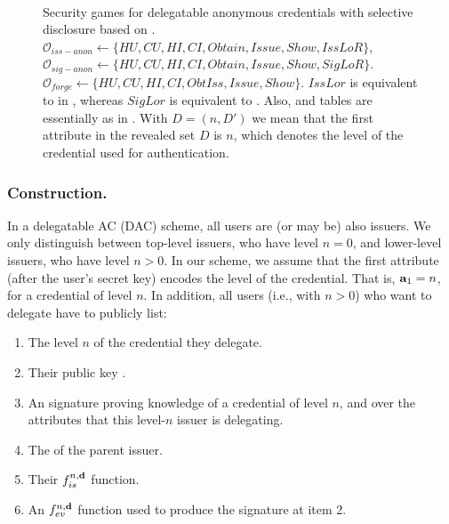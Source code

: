 \begin{figure}[ht!]
{\begin{minipage}[t]{.6\textwidth}
{        \pcind {} \\
      }       
    \end{minipage}      
  }
  \caption{Security games for delegatable anonymous credentials with selective
    disclosure based on \cite{fhs19}. $\mathcal{O}_{iss-anon} \gets \lbrace HU,
    CU,HI,CI,Obtain,Issue,Show,IssLoR\rbrace$, $\mathcal{O}_{sig-anon} \gets
    \lbrace HU,CU,HI,CI,Obtain,Issue,Show,SigLoR\rbrace$. $\mathcal{O}_{forge}
    \gets \lbrace HU,CU,HI,CI,ObtIss,Issue,Show \rbrace$. $IssLor$ is equivalent
    to \OBTCHALb in \UAS, whereas $SigLor$ is equivalent to \CHALb. Also, \OWNR
    and \ATTR tables are essentially as in . With $D =
    (n,D')$ we mean that the first attribute in the revealed set $D$ is $n$,
    which denotes the level of the credential used for authentication.}
  \label{fig:model-dac}  
\end{figure}

\subsubsection{\CUASDAC Construction.} %
In a delegatable AC (DAC) scheme, all users are (or may be) also issuers. We
only distinguish between top-level issuers, who have level $n=0$, and
lower-level issuers, who have level $n>0$. In our \CUASDAC scheme, we assume
that the first attribute (after the user's secret key) encodes the level of
the credential. That is, $\mathbf{a}_1=n$, for a credential of level $n$. In
addition, all users (i.e., with $n>0$) who want to delegate have to publicly
list:

\begin{enumerate}
\item The level $n$ of the credential they delegate.
\item Their public key \ipk.
\item An \UAS signature proving knowledge of a credential of level $n$, and over
  the attributes that this level-$n$ issuer is delegating.
\item The \ipk of the parent issuer.
\item Their $f_{is}^{n,\mathbf{d}}$ function.
\item An $f_{ev}^{n,\mathbf{d}}$ function used to produce the signature at item 2.
\end{enumerate}

